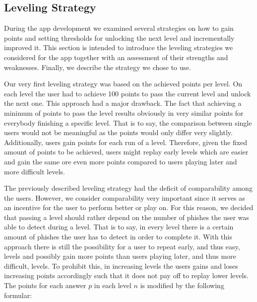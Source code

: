 \subsection{Leveling Strategy}
\label{s:leveling}
During the app development we examined several strategies on how to gain points and setting thresholds for unlocking the next level and incrementally improved it.
 This section is intended to introduce the leveling strategies we considered for the app together with an assessment of their strengths and weaknesses.
Finally, we describe the strategy we chose to use.

\begin{description}[leftmargin=0cm]
	\item[Leveling Based on Achieved Points:] Our very first leveling strategy was based on the achieved points per level.
 On each level the user had to achieve 100 points to pass the current level and unlock the next one.
 This approach had a major drawback.
 The fact that achieving a minimum of points to pass the level results obviously in very similar points for everybody finishing a specific level.
 That is to say, the comparison between single users would not be meaningful as the points would only differ very slightly.
 Additionally, users gain points for each run of a level. Therefore, given the fixed amount of points to be achieved, users might replay early levels which are easier and gain the same ore even more points compared to users playing later and more difficult levels.
	\item[Leveling Based on Detected Phishes:] The previously described leveling strategy had the deficit of comparability among the users.
 However, we consider comparability very important  since it serves as an incentive for the user to perform better or play on.
 For this reason, we decided that passing a level should rather depend on the number of phishes the user was able to detect during a level.
 That is to say, in every level there is a certain amount of phishes the user has to detect in order to complete it.
 With this approach there is still the possibility for a user to repeat early, and thus easy, levels and possibly gain more points than users playing later, and thus more difficult, levels.
 To prohibit this, in increasing levels the users gains and loses increasing points accordingly such that it does not pay off to replay lower levels.
 The points for each answer $p$ in each level $n$ is modified by the following formular:

\end{description}
